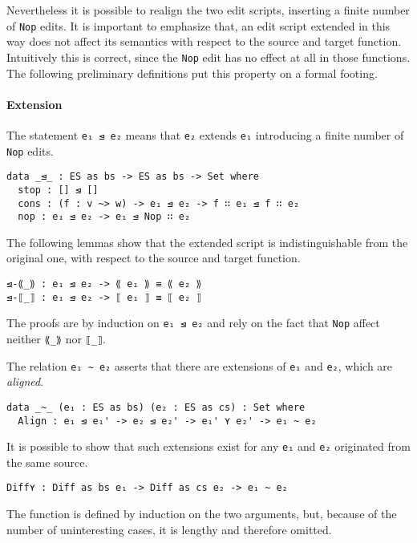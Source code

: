 \documentclass[../Thesis.tex]{subfiles}
\begin{document}
	Nevertheless it is possible to realign the two edit scripts, inserting
	a finite number of \texttt{Nop} edits.	
	It is important to emphasize that, an edit script extended in this way
	does not affect its semantics with respect to the source and target function.
	Intuitively this is correct, since the \texttt{Nop} edit has no effect at all
	in those functions.
	The following preliminary definitions put this property on a formal footing.

	\paragraph{Extension}
	\label{par:Extension}
	The statement \texttt{e₁ ⊴ e₂} means that \texttt{e₂} extends \texttt{e₁}
	introducing a finite number of \texttt{Nop} edits.
	
\begin{verbatim}
data _⊴_ : ES as bs -> ES as bs -> Set where
  stop : [] ⊴ []
  cons : (f : v ~> w) -> e₁ ⊴ e₂ -> f ∷ e₁ ⊴ f ∷ e₂
  nop : e₁ ⊴ e₂ -> e₁ ⊴ Nop ∷ e₂
\end{verbatim}
		
	The following lemmas show that the extended script is 
	indistinguishable from the original one, with respect to
	the source and target function.
	
\begin{verbatim}
⊴-⟪_⟫ : e₁ ⊴ e₂ -> ⟪ e₁ ⟫ ≡ ⟪ e₂ ⟫
⊴-⟦_⟧ : e₁ ⊴ e₂ -> ⟦ e₁ ⟧ ≡ ⟦ e₂ ⟧
\end{verbatim}

	The proofs are by induction on \texttt{e₁ ⊴ e₂} and rely on the fact that
	\texttt{Nop} affect neither \texttt{⟪\_⟫} nor \texttt{⟦\_⟧}.
	
	The relation \texttt{e₁ \textasciitilde\ e₂} asserts that there are
	extensions of \texttt{e₁} and \texttt{e₂}, which are \emph{aligned}.
	
\begin{verbatim}
data _~_ (e₁ : ES as bs) (e₂ : ES as cs) : Set where
  Align : e₁ ⊴ e₁' -> e₂ ⊴ e₂' -> e₁' ⋎ e₂' -> e₁ ~ e₂
\end{verbatim}
	
	It is possible to show that such extensions exist for any \texttt{e₁} 
	and \texttt{e₂} 	originated from the same source. 
	
\begin{verbatim}
Diff⋎ : Diff as bs e₁ -> Diff as cs e₂ -> e₁ ~ e₂
\end{verbatim}
	The function is defined by induction on the two arguments,
	but, because of the number of uninteresting cases, it is lengthy 
	and therefore omitted.
\end{document}
